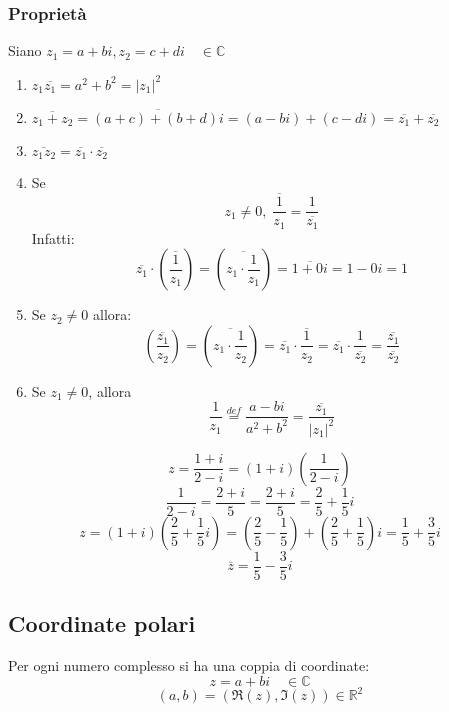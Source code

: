\documentclass[a4paper]{article}
\theoremstyle{break}
\theoremstyle{break}
\theoremstyle{break}
\theoremstyle{break}
\begin{document}
\subsubsection{Proprietà}
Siano \( z_1 = a + bi, z_2 = c + di \quad \in \mathbb{C} \)
\begin{enumerate}
	\item \( z_1 \overline{z_1} = a^2 + b^2 = |z_1|^2 \)
	\item \( \overline{z_1 + z_2} = \overline{(a+c) + (b+d)i} = (a-bi) + (c-di) = \overline{z_1} + \overline{z_2} \)
	\item \( \overline{z_1 z_2} = \overline{z_1} \cdot \overline{z_2} \)
	\item Se \[ z_1 \neq 0, \; \overline{\frac{1}{z_1}} = \frac{1}{\overline{z_1}} \]
	      Infatti:
	      \[
		      \overline{z_1} \cdot \left( \overline{\frac{1}{z_1}} \right) = \left(\overline{ z_1 \cdot \frac{1}{z_1}} \right) = \overline{1+0i} = 1 - 0i = 1
	      \]
	\item Se \( z_2 \neq 0 \) allora:
	      \[
		      \left( \overline{\frac{z_1}{z_2}} \right) = \left( \overline{z_1 \cdot \frac{1}{z_2}} \right) = \overline{z_1} \cdot \overline{\frac{1}{z_2}} = \overline{z_1} \cdot \frac{1}{\overline{z_2}} = \frac{\overline{z_1}}{\overline{z_2}}
	      \]
	\item Se \( z_1 \neq 0 \), allora
	      \[
		      \frac{1}{z_1} \stackrel{def}{=} \frac{a-bi}{a^2+b^2}= \frac{\overline{z_1}}{|z_1|^2}
	      \]
\end{enumerate}

\begin{example}
	\[
		z = \frac{1 + i}{2 - i} = \left( 1+i \right) \left( \frac{1}{2-i} \right)
	\]
	\[
		\frac{1}{2-i} = \frac{2+i}{5} = \frac{2+i}{5} = \frac{2}{5} + \frac{1}{5}i
	\]
	\[
		z = \left( 1+i \right) \left( \frac{2}{5} + \frac{1}{5}i \right) = \left( \frac{2}{5}-\frac{1}{5} \right) + \left( \frac{2}{5} + \frac{1}{5} \right)i = \frac{1}{5} + \frac{3}{5}i
	\]
	\[
		\overline{z} = \frac{1}{5} - \frac{3}{5}i
	\]
\end{example}

\subsection{Coordinate polari}
Per ogni numero complesso si ha una coppia di coordinate:
\[
	z = a + bi \quad \in \mathbb{C}
\]
\[ (a,b) = (\Re(z), \Im(z)) \in \mathbb{R}^2 \]
\end{document}
